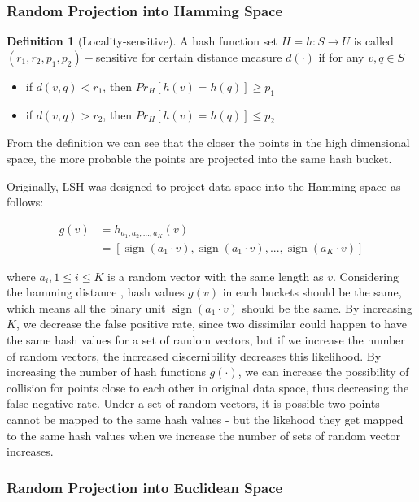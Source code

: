 \documentclass[letterpaper,twocolumn,10pt]{article}
\DeclareMathOperator{\sign}{sign}
\theoremstyle{definition}
\newtheorem{definition}{Definition}[section]
\begin{document}
\subsubsection{Random Projection into Hamming  Space}
\begin{definition}[Locality-sensitive]
	A hash function set $H = {h : S \rightarrow U}$ is called $(r_1, r_2, p_1, p_2)-$sensitive for certain distance measure $d(\cdot)$ if for any $v, q \in S$
	\begin{itemize}
		\item if $d(v, q)<r_1$, then $Pr_H[h(v)=h(q)]\geq p_1$
		\item if $d(v, q)>r_2$, then $Pr_H[h(v)=h(q)]\leq p_2$		
	\end{itemize}
\end{definition}

From the definition we can see that the closer the points in the high dimensional space, the more 
probable the points are projected into the same hash bucket. 

Originally, LSH was designed to project data space into the Hamming space as follows:

\begin{align*}
g(v) &= h_{a_1, a_2, ..., a_K}(v)  \\
&= [\sign{(a_1\cdot v )}, \sign{(a_1\cdot v )}, ..., \sign{(a_K\cdot v )}]
\end{align*}

where $a_i, 1 \leq i \leq K$ is a random vector with the same length as $v$. Considering the hamming 
distance \cite{hamming1950error}, hash values $g(v)$ in each buckets should be the same, which 
means all the binary unit $\sign{(a_1\cdot v )}$ should be the same.  By increasing $K$, we decrease 
the false positive rate, since two dissimilar could happen to have the same hash values for a set of 
random vectors, but if we increase the number of random vectors, the increased discernibility 
decreases this likelihood. By increasing the number of hash functions $g(\cdot)$, we can increase the 
possibility of collision for points close to each other in original data space, thus decreasing the false 
negative rate. Under a set of random vectors, it is possible two points cannot be mapped to the same 
hash values - but the likehood they get mapped to the same hash values when we increase the number 
of sets of random vector increases.

\subsubsection{Random Projection into  Euclidean Space}
\end{document}
